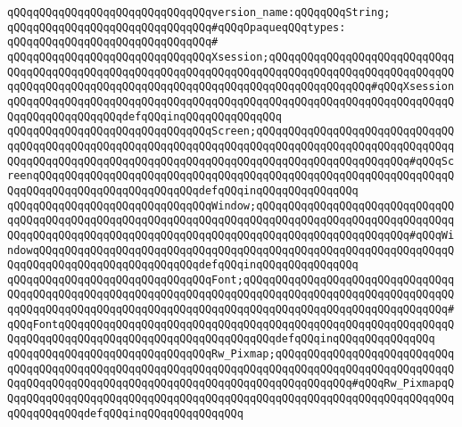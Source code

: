 \newline
\verb|qQQqqQQqqQQqqQQqqQQqqQQqqQQqqQQqversion_name:qQQqqQQqString;|\newline
\newline
\verb|qQQqqQQqqQQqqQQqqQQqqQQqqQQqqQQq#qQQqOpaqueqQQqtypes:|\newline
\verb|qQQqqQQqqQQqqQQqqQQqqQQqqQQqqQQq#|\newline
\verb|qQQqqQQqqQQqqQQqqQQqqQQqqQQqqQQqXsession;qQQqqQQqqQQqqQQqqQQqqQQqqQQqqQQqqQQqqQQqqQQqqQQqqQQqqQQqqQQqqQQqqQQqqQQqqQQqqQQqqQQqqQQqqQQqqQQqqQQqqQQqqQQqqQQqqQQqqQQqqQQqqQQqqQQqqQQqqQQqqQQqqQQqqQQqqQQq#qQQqXsessionqQQqqQQqqQQqqQQqqQQqqQQqqQQqqQQqqQQqqQQqqQQqqQQqqQQqqQQqqQQqqQQqqQQqqQQqqQQqqQQqqQQqqQQqdefqQQqinqQQqqQQqqQQqqQQq|\newline
\verb|qQQqqQQqqQQqqQQqqQQqqQQqqQQqqQQqScreen;qQQqqQQqqQQqqQQqqQQqqQQqqQQqqQQqqQQqqQQqqQQqqQQqqQQqqQQqqQQqqQQqqQQqqQQqqQQqqQQqqQQqqQQqqQQqqQQqqQQqqQQqqQQqqQQqqQQqqQQqqQQqqQQqqQQqqQQqqQQqqQQqqQQqqQQqqQQqqQQqqQQq#qQQqScreenqQQqqQQqqQQqqQQqqQQqqQQqqQQqqQQqqQQqqQQqqQQqqQQqqQQqqQQqqQQqqQQqqQQqqQQqqQQqqQQqqQQqqQQqqQQqqQQqdefqQQqinqQQqqQQqqQQqqQQq|\newline
\verb|qQQqqQQqqQQqqQQqqQQqqQQqqQQqqQQqWindow;qQQqqQQqqQQqqQQqqQQqqQQqqQQqqQQqqQQqqQQqqQQqqQQqqQQqqQQqqQQqqQQqqQQqqQQqqQQqqQQqqQQqqQQqqQQqqQQqqQQqqQQqqQQqqQQqqQQqqQQqqQQqqQQqqQQqqQQqqQQqqQQqqQQqqQQqqQQqqQQqqQQq#qQQqWindowqQQqqQQqqQQqqQQqqQQqqQQqqQQqqQQqqQQqqQQqqQQqqQQqqQQqqQQqqQQqqQQqqQQqqQQqqQQqqQQqqQQqqQQqqQQqqQQqdefqQQqinqQQqqQQqqQQqqQQq|\newline
\verb|qQQqqQQqqQQqqQQqqQQqqQQqqQQqqQQqFont;qQQqqQQqqQQqqQQqqQQqqQQqqQQqqQQqqQQqqQQqqQQqqQQqqQQqqQQqqQQqqQQqqQQqqQQqqQQqqQQqqQQqqQQqqQQqqQQqqQQqqQQqqQQqqQQqqQQqqQQqqQQqqQQqqQQqqQQqqQQqqQQqqQQqqQQqqQQqqQQqqQQqqQQqqQQq#qQQqFontqQQqqQQqqQQqqQQqqQQqqQQqqQQqqQQqqQQqqQQqqQQqqQQqqQQqqQQqqQQqqQQqqQQqqQQqqQQqqQQqqQQqqQQqqQQqqQQqqQQqqQQqdefqQQqinqQQqqQQqqQQqqQQq|\newline
\verb|qQQqqQQqqQQqqQQqqQQqqQQqqQQqqQQqRw_Pixmap;qQQqqQQqqQQqqQQqqQQqqQQqqQQqqQQqqQQqqQQqqQQqqQQqqQQqqQQqqQQqqQQqqQQqqQQqqQQqqQQqqQQqqQQqqQQqqQQqqQQqqQQqqQQqqQQqqQQqqQQqqQQqqQQqqQQqqQQqqQQqqQQqqQQqqQQq#qQQqRw_PixmapqQQqqQQqqQQqqQQqqQQqqQQqqQQqqQQqqQQqqQQqqQQqqQQqqQQqqQQqqQQqqQQqqQQqqQQqqQQqqQQqqQQqdefqQQqinqQQqqQQqqQQqqQQq|\newline
